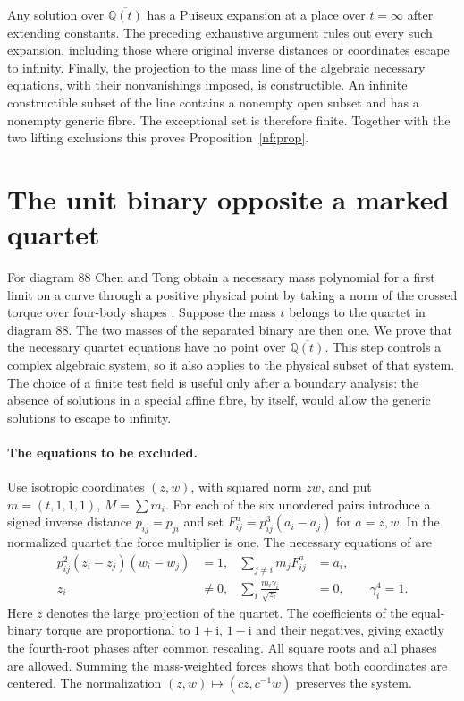 \documentclass[11pt,letterpaper]{article}
\theoremstyle{definition}
\begin{document}
Any solution over $\overline{\mathbb Q(t)}$ has a Puiseux expansion at a place over $t=\infty$ after extending constants. The preceding exhaustive argument rules out every such expansion, including those where original inverse distances or coordinates escape to infinity. Finally, the projection to the mass line of the algebraic necessary equations, with their nonvanishings imposed, is constructible. An infinite constructible subset of the line contains a nonempty open subset and has a nonempty generic fibre. The exceptional set is therefore finite. Together with the two lifting exclusions this proves Proposition~\ref{nf:prop}.
\section{The unit binary opposite a marked quartet}\label{ff:section}

For diagram 88 Chen and Tong obtain a necessary mass polynomial for a first limit on a curve through a positive physical point by taking a norm of the crossed torque over four-body shapes \cite[Prop.~5.14]{CT}. Suppose the mass $t$ belongs to the quartet in diagram 88. The two
masses of the separated binary are then one. We prove that the
necessary quartet equations have no point over
$\overline{\mathbb Q(t)}$. This step controls a complex algebraic
system, so it also applies to the physical subset of that system.
The choice of a finite test field is useful only after a boundary
analysis: the absence of solutions in a special affine fibre, by
itself, would allow the generic solutions to escape to infinity.

\paragraph{The equations to be excluded.}
Use isotropic coordinates $(z,w)$, with squared norm $zw$, and put
$m=(t,1,1,1)$, $M=\sum m_i$. For each of the six unordered pairs
introduce a signed inverse distance $p_{ij}=p_{ji}$ and set
$F^a_{ij}=p_{ij}^3(a_i-a_j)$ for $a=z,w$. In the normalized quartet
the force multiplier is one. The necessary equations of
\cite[Lemmas 6.16(a) and 6.17(a)]{Tomar} are
\begin{align}
 p_{ij}^2(z_i-z_j)(w_i-w_j)&=1,&
 \sum_{j\ne i}m_j F^a_{ij}&=a_i,\label{ff:quartet}\\
 z_i&\ne0,& \sum_i\frac{m_i\gamma_i}{\sqrt{z_i}}&=0,
 \qquad \gamma_i^4=1.\label{ff:torque}
\end{align}
Here $z$ denotes the large projection of the quartet. The coefficients
of the equal-binary torque are proportional to $1+\mathrm i$,
$1-\mathrm i$ and their negatives, giving exactly the fourth-root
phases after common rescaling. All square roots and all phases are
allowed. Summing the mass-weighted forces shows that both coordinates
are centered. The normalization $(z,w)\mapsto(cz,c^{-1}w)$ preserves
the system.
\end{document}
